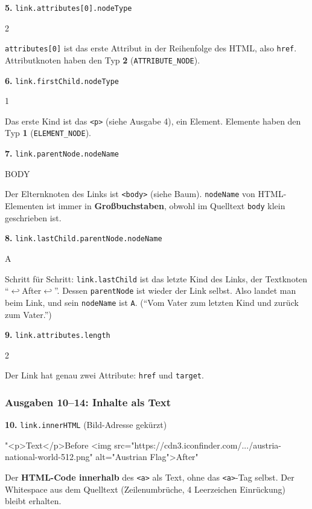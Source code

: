 \documentclass[a4paper,11pt]{article}
\newcommand{\nl}{\ensuremath{\hookleftarrow}}
\newcommand{\ws}{\textvisiblespace}
\begin{document}
\textbf{5.} \lstinline|link.attributes[0].nodeType|
\begin{ausgabe}
2
\end{ausgabe}
\lstinline|attributes[0]| ist das erste Attribut in der Reihenfolge des HTML, also \texttt{href}. Attributknoten haben
den Typ \textbf{2} (\texttt{ATTRIBUTE\_NODE}).

\textbf{6.} \lstinline|link.firstChild.nodeType|
\begin{ausgabe}
1
\end{ausgabe}
Das erste Kind ist das \texttt{<p>} (siehe Ausgabe 4), ein Element. Elemente haben den Typ \textbf{1}
(\texttt{ELEMENT\_NODE}).

\textbf{7.} \lstinline|link.parentNode.nodeName|
\begin{ausgabe}
BODY
\end{ausgabe}
Der Elternknoten des Links ist \texttt{<body>} (siehe Baum). \texttt{nodeName} von HTML-Elementen ist immer in
\textbf{Großbuchstaben}, obwohl im Quelltext \texttt{body} klein geschrieben ist.

\textbf{8.} \lstinline|link.lastChild.parentNode.nodeName|
\begin{ausgabe}
A
\end{ausgabe}
Schritt für Schritt: \lstinline|link.lastChild| ist das letzte Kind des Links, der Textknoten
"`\nl\ws\ws\ws\ws After\nl"'. Dessen \lstinline|parentNode| ist wieder der Link selbst. Also landet man beim Link,
und sein \texttt{nodeName} ist \texttt{\textquotedbl{}A\textquotedbl{}}. ("`Vom Vater zum letzten Kind und zurück zum Vater."')

\textbf{9.} \lstinline|link.attributes.length|
\begin{ausgabe}
2
\end{ausgabe}
Der Link hat genau zwei Attribute: \texttt{href} und \texttt{target}.

\subsubsection*{Ausgaben 10--14: Inhalte als Text}

\textbf{10.} \lstinline|link.innerHTML| (Bild-Adresse gekürzt)
\begin{ausgabe}
"<p>Text</p>\n    Before <img src="https://cdn3.iconfinder.com/.../austria-national-world-512.png" alt="Austrian Flag">\n    After\n"
\end{ausgabe}
Der \textbf{HTML-Code innerhalb} des \texttt{<a>} als Text, ohne das \texttt{<a>}-Tag selbst. Der Whitespace aus dem
Quelltext (Zeilenumbrüche, 4 Leerzeichen Einrückung) bleibt erhalten.
\end{document}
